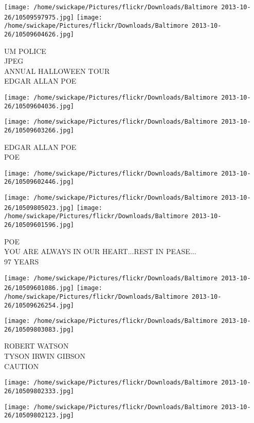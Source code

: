 \documentclass[10pt,letterpaper]{article}
\begin{document}
\texttt{[image: /home/swickape/Pictures/flickr/Downloads/Baltimore 2013-10-26/10509597975.jpg]}
\texttt{[image: /home/swickape/Pictures/flickr/Downloads/Baltimore 2013-10-26/10509604626.jpg]}

UM POLICE\\
JPEG\\
ANNUAL HALLOWEEN TOUR\\
EDGAR ALLAN POE
\pagebreak

\texttt{[image: /home/swickape/Pictures/flickr/Downloads/Baltimore 2013-10-26/10509604036.jpg]}

\vspace{0.25in}
\texttt{[image: /home/swickape/Pictures/flickr/Downloads/Baltimore 2013-10-26/10509603266.jpg]}

EDGAR ALLAN POE\\
POE
\pagebreak

\texttt{[image: /home/swickape/Pictures/flickr/Downloads/Baltimore 2013-10-26/10509602446.jpg]}

\vspace{0.25in}
\texttt{[image: /home/swickape/Pictures/flickr/Downloads/Baltimore 2013-10-26/10509805023.jpg]}
\texttt{[image: /home/swickape/Pictures/flickr/Downloads/Baltimore 2013-10-26/10509601596.jpg]}

POE\\
YOU ARE ALWAYS IN OUR HEART...REST IN PEASE...\\
97 YEARS
\pagebreak

\texttt{[image: /home/swickape/Pictures/flickr/Downloads/Baltimore 2013-10-26/10509601086.jpg]}
\texttt{[image: /home/swickape/Pictures/flickr/Downloads/Baltimore 2013-10-26/10509626254.jpg]}

\vspace{0.25in}
\texttt{[image: /home/swickape/Pictures/flickr/Downloads/Baltimore 2013-10-26/10509803083.jpg]}

ROBERT WATSON\\
TYSON IRWIN GIBSON\\
CAUTION
\pagebreak

\texttt{[image: /home/swickape/Pictures/flickr/Downloads/Baltimore 2013-10-26/10509802333.jpg]}

\vspace{0.25in}
\texttt{[image: /home/swickape/Pictures/flickr/Downloads/Baltimore 2013-10-26/10509802123.jpg]}
\end{document}
